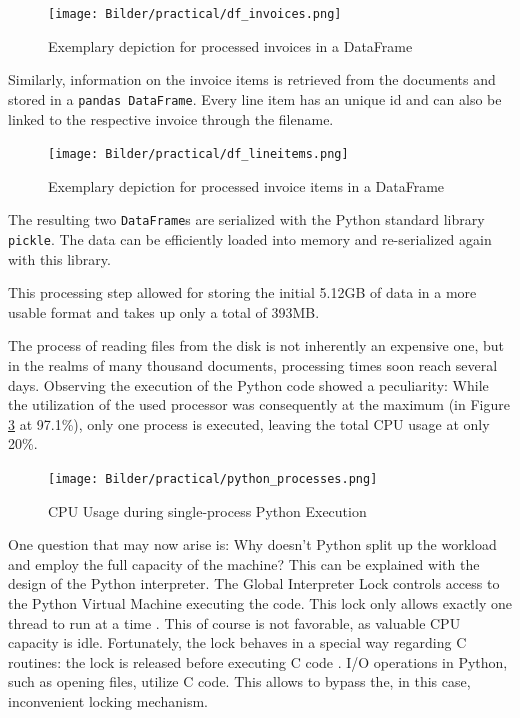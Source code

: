 	\begin{figure}[ht]
		\centering
		\texttt{[image: Bilder/practical/df\_invoices.png]}
		\caption{Exemplary depiction for processed invoices in a DataFrame}
		\label{fig:df-invoices}
	\end{figure}

	Similarly, information on the invoice items is retrieved from the documents and stored in a \lstinline|pandas DataFrame|. Every line item has an unique id and can also be linked to the respective invoice through the filename.
	
	\begin{figure}[ht]
		\centering
		\texttt{[image: Bilder/practical/df\_lineitems.png]}
		\caption{Exemplary depiction for processed invoice items in a DataFrame}
		\label{fig:df-invoice}
	\end{figure}
	
	The resulting two \lstinline|DataFrame|s are serialized with the Python standard library \lstinline|pickle|. The data can be efficiently loaded into memory and re-serialized again with this library.
	
	This processing step allowed for storing the initial 5.12GB of data in a more usable format and takes up only a total of 393MB.

	The process of reading files from the disk is not inherently an expensive one, but in the realms of many thousand documents, processing times soon reach several days. Observing the execution of the Python code showed a peculiarity: While the utilization of the used processor was consequently at the maximum (in Figure \ref{fig:cpu} at 97.1\%), only one process is executed, leaving the total \ac{CPU} usage at only 20\%. 
	
	\begin{figure}[ht]
		\centering
		\texttt{[image: Bilder/practical/python\_processes.png]}
		\caption{\acs{CPU} Usage during single-process Python Execution}
		\label{fig:cpu}
	\end{figure}
	
	
	One question that may now arise is: Why doesn't Python split up the workload and employ the full capacity of the machine?
	This can be explained with the design of the Python interpreter. The Global Interpreter Lock controls access to the Python Virtual Machine executing the code. This lock only allows exactly one thread to run at a time \cite[ch.~18.3.1]{corePython}. This of course is not favorable, as valuable CPU capacity is idle. Fortunately, the lock behaves in a special way regarding C routines: the lock is released before executing C code \cite[ch.~18.3.1]{corePython}. I/O operations in Python, such as opening files, utilize C code. This allows to bypass the, in this case, inconvenient locking mechanism. 
	

